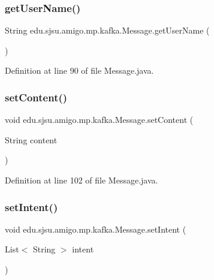 \subsubsection{\texorpdfstring{get\+User\+Name()}{getUserName()}}
{\footnotesize\ttfamily String edu.\+sjsu.\+amigo.\+mp.\+kafka.\+Message.\+get\+User\+Name (\begin{DoxyParamCaption}{ }\end{DoxyParamCaption})}



Definition at line 90 of file Message.\+java.

\mbox{\label{classedu_1_1sjsu_1_1amigo_1_1mp_1_1kafka_1_1_message_a3055123d7c4e5a480dfaa5c106c38cf9}} 
\subsubsection{\texorpdfstring{set\+Content()}{setContent()}}
{\footnotesize\ttfamily void edu.\+sjsu.\+amigo.\+mp.\+kafka.\+Message.\+set\+Content (\begin{DoxyParamCaption}\item[{String}]{content }\end{DoxyParamCaption})}



Definition at line 102 of file Message.\+java.

\mbox{\label{classedu_1_1sjsu_1_1amigo_1_1mp_1_1kafka_1_1_message_a6ad0370cf5e5abfa0dd6abc480b5a0a3}} 
\subsubsection{\texorpdfstring{set\+Intent()}{setIntent()}}
{\footnotesize\ttfamily void edu.\+sjsu.\+amigo.\+mp.\+kafka.\+Message.\+set\+Intent (\begin{DoxyParamCaption}\item[{List$<$ String $>$}]{intent }\end{DoxyParamCaption})}



